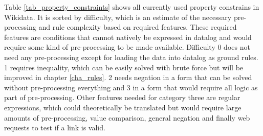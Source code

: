 \documentclass[hyperref,bachelorofscience,fleqn]{cgvpub}
\begin{document}
Table \ref{tab_property_constraints} shows all currently used property constrains in Wikidata. It is sorted by difficulty, which is an estimate of the necessary pre-processing and rule complexity based on required features. These required features are conditions that cannot natively be expressed in datalog and would require some kind of pre-processing to be made available. Difficulty 0 does not need any pre-processing except for loading the data into datalog as ground rules. 1 requires inequality, which can be easily solved with brute force but will be improved in chapter \ref{cha_rules}. 2 needs negation in a form that can be solved without pre-processing everything and 3 in a form that would require all logic as part of pre-processing. Other features needed for category three are regular expressions, which could theoretically be translated but would require large amounts of pre-processing, value comparison, general negation and finally web requests to test if a link is valid.
\end{document}
